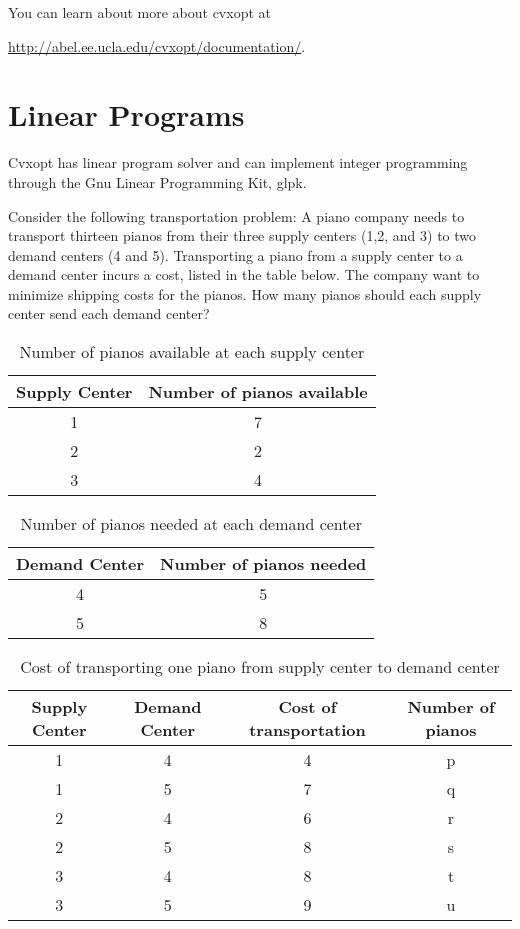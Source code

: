 \label{lab:Optimization 2}

You can learn about more about cvxopt at  

\url{http://abel.ee.ucla.edu/cvxopt/documentation/}.

\section*{Linear Programs}

Cvxopt has linear program solver and can implement integer programming through the Gnu Linear Programming Kit, glpk.

Consider the following transportation problem:
A piano company needs to transport thirteen pianos from their three  supply centers (1,2, and 3) to two demand centers (4 and 5).
Transporting a piano from a supply center to a demand center incurs a cost, listed in the table below.
The company want to minimize shipping costs for the pianos.
How many pianos should each supply center send each demand center?

\begin{table}[h]
\centering
\begin{tabular}{|c|c|}
Supply Center & Number of pianos available\\
\hline
1 & 7\\
2 & 2\\
3 & 4\\
\end{tabular}

\caption{Number of pianos available at each supply center}
\end{table}

\begin{table}[h]
\centering
\begin{tabular}{|c|c|}
Demand Center & Number of pianos needed\\
\hline
4 & 5\\
5 & 8\\
\end{tabular}

\caption{Number of pianos needed at each demand center}
\end{table}

\begin{table}[h]
\centering
\begin{tabular}{|c|c|c|c|}
Supply Center & Demand Center & Cost of transportation & Number of pianos\\
\hline
1 & 4 & 4 & p\\
1 & 5 & 7 & q\\
2 & 4 & 6 & r\\
2 & 5 & 8 & s\\
3 & 4 & 8 & t\\
3 & 5 & 9 & u\\
\end{tabular}
\caption{Cost of transporting one piano from supply center to demand center}
\end{table}

